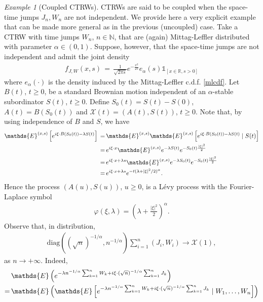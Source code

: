 \documentclass[reqno]{amsart}
\theoremstyle{remark}
\newtheorem{example}[theorem]{Example}
\numberwithin{equation}{section} %
\newcommand{\NN}{\mathbb{N}}
\newcommand{\1}{\mathds{1}}
\begin{document}
	\begin{example}[Coupled CTRWs]
		\label{example_limit_coupled}
		CTRWs are said to be coupled when the space-time jumps $J_n, W_n$ are not independent. We provide here a very explicit example that can be made more general as in the previous (uncoupled) case. Take a CTRW with time jumps $W_n$, $n\in\NN$, that are (again) Mittag-Leffler distributed with parameter $\alpha\in (0,1)$. Suppose, however, that the space-time jumps are not independent and admit the joint density
		\begin{align}
			f_{J,W}(x,s) \, = \, \frac{1}{\sqrt{2\pi s}} e^{-\frac{x^2}{2s}} e_\alpha (s) \mathds{1}_{[x \in \mathbb{R}, s > 0]}
		\end{align}
		where $e_\alpha (\cdot)$ is the density induced by the Mittag-Leffler c.d.f. \eqref{mlcdf}. 
		Let $B(t)$, $t \geq 0$, be a standard Brownian motion independent of an $\alpha$-stable subordinator $S(t)$, $t \geq 0$. Define $S_0(t) = S(t) - S(0)$, $A(t) = B(S_0(t))$ and $\mathcal{X}(t) = (A(t), S(t))$, $t \geq 0$. Note that, by using independence of $B$ and $S$, we have
		\begin{align}
			\mathds{E}^{(x,s)}\left[e^{i\xi \cdot B(S_0(t))-\lambda S(t) } \right]\, = \, &\mathds{E}^{(x,s)}  \mathds{E}^{(x,s)} \left[ e^{i\xi \cdot B(S_0(t))-\lambda S(t) } \mid S(t) \right] \notag \\ 
			= \, &e^{i\xi \cdot x} \mathds{E}^{(x,s)} e^{-\lambda S(t)}  e^{-S_0(t) \frac{|\xi|^2}{2}} \notag \\
			= \, & e^{i\xi \cdot x+\lambda s} \mathds{E}^{(x,s)} e^{-\lambda S_0(t)}  e^{-S_0(t) \frac{|\xi|^2}{2}} \notag \\
			= \, & e^{i\xi \cdot x+\lambda s} e^{-t(\lambda + |\xi|^2/2)^\alpha}.
		\end{align}
		Hence the process $(A(u), S(u))$, $u\ge 0$, is a L\'evy process with the Fourier-Laplace symbol
		\begin{align}
			\varphi (\xi, \lambda)=  \left( \lambda + \frac{|\xi|^2}{2} \right)^\alpha.
		\end{align}
		Observe that, in distribution, 
		\begin{align}
			\text{diag}\left( (\sqrt{n})^{-1/\alpha}, n^{-1/\alpha} \right) \sum_{i=1}^n (J_i, W_i) \to \mathcal{X}(1),
		\end{align}
		as $n \to +\infty$. Indeed,
		\begin{align}
			& \mathds{E}\left(e^{-\lambda n^{-1/\alpha}\sum_{k=1}^{n} W_k + i\xi \cdot (\sqrt{n})^{-1/\alpha}\sum_{k=1}^{n} J_k}\right) \notag \\ = \, &\mathds{E} \left(\mathds{E} \left[ e^{-\lambda n^{-1/\alpha}\sum_{k=1}^{n} W_k + i\xi \cdot (\sqrt{n})^{-1/\alpha}\sum_{k=1}^{n} J_k} \mid W_1, \dots, W_{n} \right]\right) \notag \\

\end{align}
\end{example}
\end{document}
